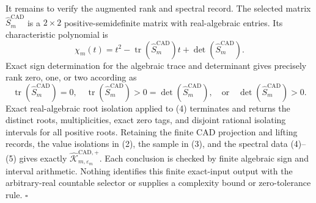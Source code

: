 It remains to verify the augmented rank and spectral record.  The selected matrix \(\widehat S_m^{\mathrm{CAD}}\) is a \(2\times2\) positive-semidefinite matrix with real-algebraic entries.  Its characteristic polynomial is
\[
\chi_m(t)=t^2-\operatorname{tr}(\widehat S_m^{\mathrm{CAD}})t
+\det(\widehat S_m^{\mathrm{CAD}}).
\tag{4}
\]
Exact sign determination for the algebraic trace and determinant gives precisely rank zero, one, or two according as
\[
\operatorname{tr}(\widehat S_m^{\mathrm{CAD}})=0,
\quad
\operatorname{tr}(\widehat S_m^{\mathrm{CAD}})>0=\det(\widehat S_m^{\mathrm{CAD}}),
\quad\text{or}\quad
\det(\widehat S_m^{\mathrm{CAD}})>0.
\tag{5}
\]
Exact real-algebraic root isolation applied to (4) terminates and returns the distinct roots, multiplicities, exact zero tags, and disjoint rational isolating intervals for all positive roots.  Retaining the finite CAD projection and lifting records, the value isolations in (2), the sample in (3), and the spectral data (4)--(5) gives exactly \(\widehat{\mathscr K}_{m,\varepsilon_m}^{\mathrm{CAD},+}\).  Each conclusion is checked by finite algebraic sign and interval arithmetic.  Nothing identifies this finite exact-input output with the arbitrary-real countable selector or supplies a complexity bound or zero-tolerance rule. \(\square\)